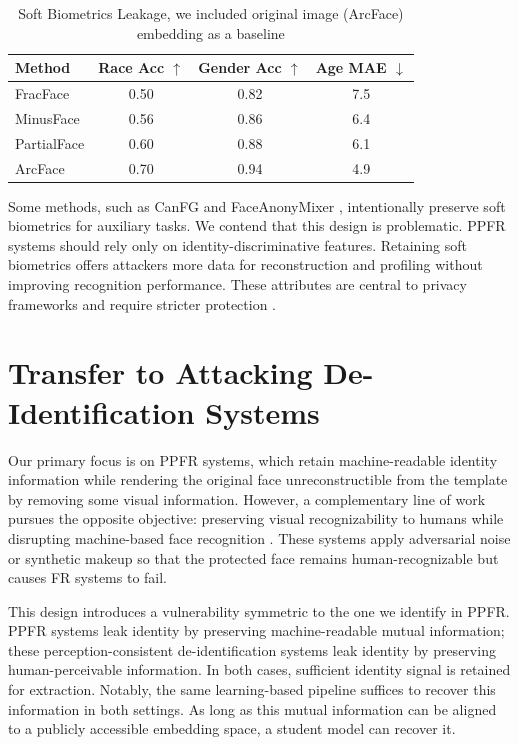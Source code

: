 \begin{table}[h]
\centering

\caption{Soft Biometrics Leakage, we included original image (ArcFace) embedding as a baseline}
\label{tab:soft}
\begin{tabular}{lccc}
\toprule
Method & Race Acc $\uparrow$ & Gender Acc $\uparrow$ & Age MAE $\downarrow$ \\
\midrule
FracFace & 0.50& 0.82& 7.5\\
MinusFace & 0.56& 0.86& 6.4\\
PartialFace & 0.60& 0.88& 6.1\\
\midrule
ArcFace & 0.70& 0.94&  4.9\\
\bottomrule
\end{tabular}
\vskip -0.1in
\end{table}

Some methods, such as CanFG \cite{wang_make_2024} and FaceAnonyMixer \cite{alam_faceanonymixer_2025}, intentionally preserve soft biometrics for auxiliary tasks. We contend that this design is problematic. PPFR systems should rely only on identity-discriminative features. Retaining soft biometrics offers attackers more data for reconstruction and profiling without improving recognition performance. These attributes are central to privacy frameworks and require stricter protection \cite{osorio-roig_attack_2022}.

\section{Transfer to Attacking De-Identification Systems}
Our primary focus is on PPFR systems, which retain machine-readable identity information while rendering the original face unreconstructible from the template by removing some visual information. However, a complementary line of work pursues the opposite objective: preserving visual recognizability to humans while disrupting machine-based face recognition \cite{salar_enhancing_2025, yang_towards_2021, shamshad_clip2protect_2023}. These systems apply adversarial noise or synthetic makeup so that the protected face remains human-recognizable but causes FR systems to fail.

This design introduces a vulnerability symmetric to the one we identify in PPFR. PPFR systems leak identity by preserving machine-readable mutual information; these perception-consistent de-identification systems leak identity by preserving human-perceivable information. In both cases, sufficient identity signal is retained for extraction. Notably, the same learning-based pipeline suffices to recover this information in both settings. As long as this mutual information can be aligned to a publicly accessible embedding space, a student model can recover it. 

